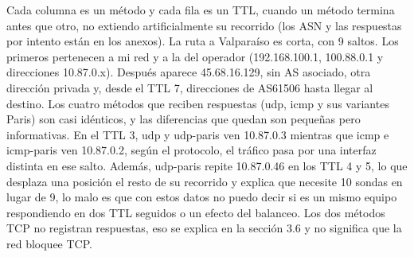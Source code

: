 
Cada columna es un método y cada fila es un TTL, cuando un método termina antes que otro, no extiendo artificialmente su recorrido (los ASN y las respuestas por intento están en los anexos).
La ruta a Valparaíso es corta, con 9 saltos. Los primeros pertenecen a mi red y a la del operador (192.168.100.1, 100.88.0.1 y direcciones 10.87.0.x). Después aparece 45.68.16.129, sin AS asociado, otra dirección privada y, desde el TTL 7, direcciones de AS61506 hasta llegar al destino. Los cuatro métodos que reciben respuestas (udp, icmp y sus variantes Paris) son casi idénticos, y las diferencias que quedan son pequeñas pero informativas. En el TTL 3, udp y udp-paris ven 10.87.0.3 mientras que icmp e icmp-paris ven 10.87.0.2, según el protocolo, el tráfico pasa por una interfaz distinta en ese salto. Además, udp-paris repite 10.87.0.46 en los TTL 4 y 5, lo que desplaza una posición el resto de su recorrido y explica que necesite 10 sondas en lugar de 9, lo malo es que con estos datos no puedo decir si es un mismo equipo respondiendo en dos TTL seguidos o un efecto del balanceo. Los dos métodos TCP no registran respuestas, eso se explica en la sección 3.6 y no significa que la red bloquee TCP.

